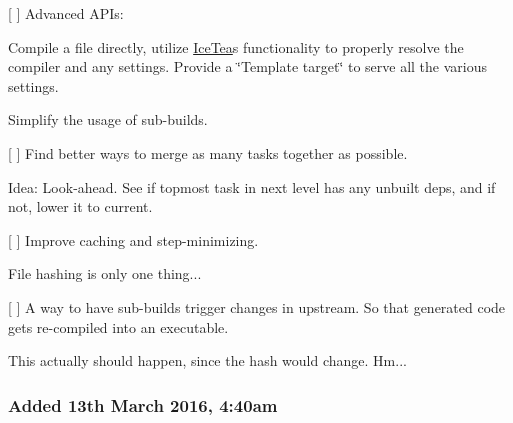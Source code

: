 \begin{DoxyItemize}
\item \mbox{[} \mbox{]} Advanced A\+P\+Is\+:
\begin{DoxyItemize}
\item Compile a file directly, utilize \hyperlink{class_ice_tea}{Ice\+Tea}\textquotesingle{}s functionality to properly resolve the compiler and any settings. Provide a \char`\"{}\+Template target\char`\"{} to serve all the various settings.
\item Simplify the usage of sub-\/builds.
\end{DoxyItemize}
\item \mbox{[} \mbox{]} Find better ways to merge as many tasks together as possible.
\begin{DoxyItemize}
\item Idea\+: Look-\/ahead. See if topmost task in next level has any unbuilt deps, and if not, lower it to current.
\end{DoxyItemize}
\item \mbox{[} \mbox{]} Improve caching and step-\/minimizing.
\begin{DoxyItemize}
\item File hashing is only one thing...
\end{DoxyItemize}
\item \mbox{[} \mbox{]} A way to have sub-\/builds trigger changes in upstream. So that generated code gets re-\/compiled into an executable.
\begin{DoxyItemize}
\item This actually should happen, since the hash would change. Hm...
\end{DoxyItemize}
\end{DoxyItemize}

\subsubsection*{Added 13th March 2016, 4\+:40am}


